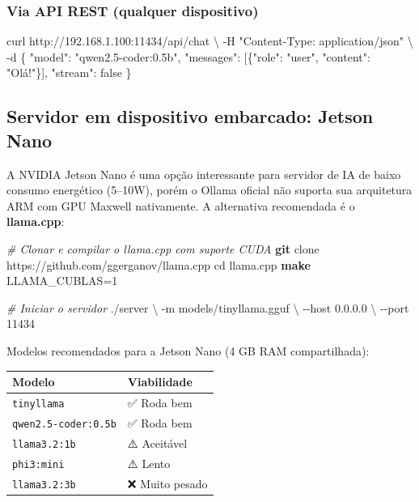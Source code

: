\documentclass[
]{article}
\newenvironment{Shaded}{\begin{snugshade}}{\end{snugshade}}
\newcommand{\AttributeTok}[1]{\textcolor[rgb]{0.13,0.29,0.53}{#1}}
\newcommand{\BuiltInTok}[1]{#1}
\newcommand{\CommentTok}[1]{\textcolor[rgb]{0.56,0.35,0.01}{\textit{#1}}}
\newcommand{\DataTypeTok}[1]{\textcolor[rgb]{0.13,0.29,0.53}{#1}}
\newcommand{\ExtensionTok}[1]{#1}
\newcommand{\FunctionTok}[1]{\textcolor[rgb]{0.13,0.29,0.53}{\textbf{#1}}}
\newcommand{\NormalTok}[1]{#1}
\newcommand{\StringTok}[1]{\textcolor[rgb]{0.31,0.60,0.02}{#1}}
\begin{document}
\subsubsection{Via API REST (qualquer
dispositivo)}\label{via-api-rest-qualquer-dispositivo}

\begin{Shaded}
\begin{Highlighting}[]
\ExtensionTok{curl}\NormalTok{ http://192.168.1.100:11434/api/chat }\DataTypeTok{\textbackslash{}}
  \AttributeTok{{-}H} \StringTok{"Content{-}Type: application/json"} \DataTypeTok{\textbackslash{}}
  \AttributeTok{{-}d} \StringTok{\textquotesingle{}\{}
\StringTok{    "model": "qwen2.5{-}coder:0.5b",}
\StringTok{    "messages": [\{"role": "user", "content": "Olá!"\}],}
\StringTok{    "stream": false}
\StringTok{  \}\textquotesingle{}}
\end{Highlighting}
\end{Shaded}

\subsection{Servidor em dispositivo embarcado: Jetson
Nano}\label{servidor-em-dispositivo-embarcado-jetson-nano}

A NVIDIA Jetson Nano é uma opção interessante para servidor de IA de
baixo consumo energético (5--10W), porém o Ollama oficial não suporta
sua arquitetura ARM com GPU Maxwell nativamente. A alternativa
recomendada é o \textbf{llama.cpp}:

\begin{Shaded}
\begin{Highlighting}[]
\CommentTok{\# Clonar e compilar o llama.cpp com suporte CUDA}
\FunctionTok{git}\NormalTok{ clone https://github.com/ggerganov/llama.cpp}
\BuiltInTok{cd}\NormalTok{ llama.cpp}
\FunctionTok{make}\NormalTok{ LLAMA\_CUBLAS=1}

\CommentTok{\# Iniciar o servidor}
\ExtensionTok{./server} \DataTypeTok{\textbackslash{}}
  \AttributeTok{{-}m}\NormalTok{ models/tinyllama.gguf }\DataTypeTok{\textbackslash{}}
  \AttributeTok{{-}{-}host}\NormalTok{ 0.0.0.0 }\DataTypeTok{\textbackslash{}}
  \AttributeTok{{-}{-}port}\NormalTok{ 11434}
\end{Highlighting}
\end{Shaded}

Modelos recomendados para a Jetson Nano (4 GB RAM compartilhada):

\begin{longtable}[]{@{}ll@{}}
\toprule\noalign{}
Modelo & Viabilidade \\
\midrule\noalign{}
\endhead
\bottomrule\noalign{}
\endlastfoot
\texttt{tinyllama} & ✅ Roda bem \\
\texttt{qwen2.5-coder:0.5b} & ✅ Roda bem \\
\texttt{llama3.2:1b} & ⚠️ Aceitável \\
\texttt{phi3:mini} & ⚠️ Lento \\
\texttt{llama3.2:3b} & ❌ Muito pesado \\
\end{longtable}
\end{document}
